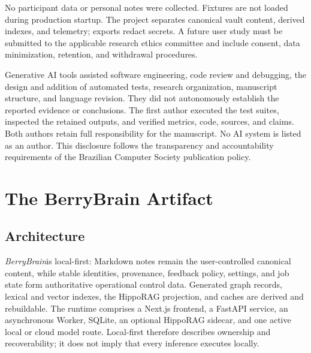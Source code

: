 \documentclass{sbc2023}
\newcommand{\BerryBrain}{\textit{BerryBrain}}
\begin{document}
No participant data or personal notes were collected. Fixtures are not loaded during production
startup. The project separates canonical vault content, derived indexes, and telemetry; exports
redact secrets. A future user study must be submitted to the applicable research ethics committee
and include consent, data minimization, retention, and withdrawal procedures.

Generative AI tools assisted software engineering, code review and debugging, the design and
addition of automated tests, research organization, manuscript structure, and language revision.
They did not autonomously establish the reported evidence or conclusions. The first author executed
the test suites, inspected the retained outputs, and verified metrics, code, sources, and claims.
Both authors retain full responsibility for the manuscript. No AI system is listed as an author. This
disclosure follows the transparency and accountability requirements of the Brazilian Computer
Society publication policy.

\section{The BerryBrain Artifact}
\label{sec:artifact}

\subsection{Architecture}

\BerryBrain is local-first: Markdown notes remain the user-controlled canonical content, while
stable identities, provenance, feedback policy, settings, and job state form authoritative
operational control data. Generated graph records, lexical and vector indexes, the HippoRAG
projection, and caches are derived and rebuildable. The runtime comprises a Next.js frontend, a
FastAPI service, an asynchronous Worker, SQLite, an optional HippoRAG sidecar, and one active local
or cloud model route. Local-first therefore describes ownership and recoverability; it does not
imply that every inference executes locally.
\end{document}
